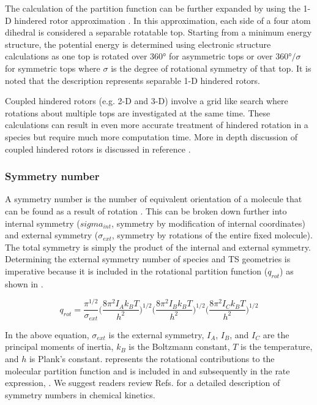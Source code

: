 \documentclass[preprint, 11pt]{elsarticle} %
\begin{document}
The calculation of the partition function can be further expanded by using the 1-D hindered rotor approximation \cite{pitzer:1942, pfaendtner:2007, Lin:2008}. 
In this approximation, each side of a four atom dihedral is considered a separable rotatable top.
Starting from a minimum energy structure, the potential energy is determined using electronic structure calculations as one top is rotated over \ang{360} for asymmetric tops or over $\ang{360}/\sigma$ for symmetric tops where $\sigma$ is the degree of rotational symmetry of that top. 
It is noted that the description represents separable 1-D hindered rotors.

Coupled hindered rotors (e.g. 2-D and 3-D) involve a grid like search where rotations about multiple tops are investigated at the same time. 
These calculations can result in even more accurate treatment of hindered rotation in a species but require much more computation time.
More in depth discussion of coupled hindered rotors is discussed in reference \cite{fernandezramos:2013}.


\subsubsection{Symmetry number}

A symmetry number is the number of equivalent orientation of a molecule that can be found as a result of rotation \cite{Lynch:2004, gilson:2010}.
This can be broken down further into internal symmetry ($sigma_{int}$, symmetry by modification of internal coordinates) and external symmetry ($\sigma_{ext}$, symmetry by rotations of the entire fixed molecule).
The total symmetry is simply the product of the internal and external symmetry.
Determining the external symmetry number of species and TS geometries is imperative because it is included in the rotational partition function ($q_{rot}$) as shown in .

\begin{equation}
    q_{rot} = \frac{\pi^{1/2}}{\sigma_{ext}}\Big(\frac{8 \pi^2 I_A k_B T}{h^2}\Big)^{1/2} \Big(\frac{8 \pi^2 I_B k_B T}{h^2}\Big)^{1/2} \Big(\frac{8 \pi^2 I_C k_B T}{h^2}\Big)^{1/2}
    \label{eq:q_rot}
\end{equation}

In the above equation, $\sigma_{ext}$ is the external symmetry, $I_A$, $I_B$, and $I_C$ are the principal moments of inertia, $k_B$ is the Boltzmann constant, $T$ is the temperature, and $h$ is Plank's constant. 
 represents the rotational contributions to the molecular partition function and is included in  and subsequently in the rate expression, . 
We suggest readers review Refs. \cite{FernandezRamos:2007, Pollak:1978} for a detailed description of symmetry numbers in chemical kinetics.
\end{document}
